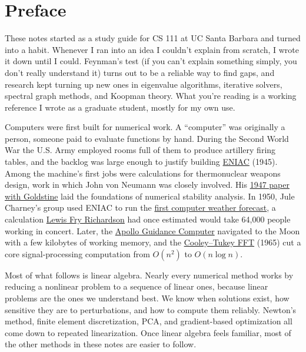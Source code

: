 \documentclass[../main.tex]{subfiles}
\begin{document}
\section*{Preface}

These notes started as a study guide for CS 111 at UC Santa Barbara and turned into a habit. Whenever I ran into an idea I couldn't explain from scratch, I wrote it down until I could. Feynman's test (if you can't explain something simply, you don't really understand it) turns out to be a reliable way to find gaps, and research kept turning up new ones in eigenvalue algorithms, iterative solvers, spectral graph methods, and Koopman theory. What you're reading is a working reference I wrote as a graduate student, mostly for my own use.

\medskip

Computers were first built for numerical work. A ``computer'' was originally a person, someone paid to evaluate functions by hand. During the Second World War the U.S. Army employed rooms full of them to produce artillery firing tables, and the backlog was large enough to justify building \href{https://www.computerhistory.org/revolution/birth-of-the-computer/4/78/323}{ENIAC} (1945). Among the machine's first jobs were calculations for thermonuclear weapons design, work in which John von Neumann was closely involved. His \href{https://projecteuclid.org/journals/bulletin-of-the-american-mathematical-society-new-series/volume-53/issue-11/Numerical-inverting-of-matrices-of-high-order/bams/1183511222.full}{1947 paper with Goldstine} laid the foundations of numerical stability analysis. In 1950, Jule Charney's group used ENIAC to run the \href{https://maths.ucd.ie/~plynch/eniac/CFvN-1950.pdf}{first computer weather forecast}, a calculation \href{https://archive.org/details/weatherpredictio00richrich}{Lewis Fry Richardson} had once estimated would take 64,000 people working in concert. Later, the \href{https://ntrs.nasa.gov/citations/19760016247}{Apollo Guidance Computer} navigated to the Moon with a few kilobytes of working memory, and the \href{https://www.ams.org/journals/mcom/1965-19-090/S0025-5718-1965-0178586-1/S0025-5718-1965-0178586-1.pdf}{Cooley--Tukey FFT} (1965) cut a core signal-processing computation from $O(n^2)$ to $O(n \log n)$.

\medskip

Most of what follows is linear algebra. Nearly every numerical method works by reducing a nonlinear problem to a sequence of linear ones, because linear problems are the ones we understand best. We know when solutions exist, how sensitive they are to perturbations, and how to compute them reliably. Newton's method, finite element discretization, PCA, and gradient-based optimization all come down to repeated linearization. Once linear algebra feels familiar, most of the other methods in these notes are easier to follow.
\end{document}
